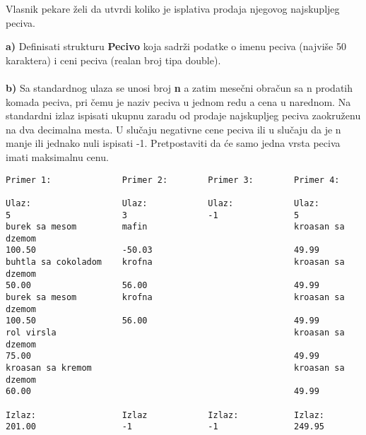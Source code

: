 \begin{Exercise}[label=v1.3_01] 
    Vlasnik pekare želi da utvrdi koliko je isplativa prodaja njegovog
    najskupljeg peciva.
    
    \textbf{a)} Definisati strukturu \textbf{Pecivo} koja sadrži
    podatke o imenu peciva (najviše 50 karaktera) i ceni peciva
    (realan broj tipa double).  \\ \\ \textbf{b)} Sa standardnog ulaza
    se unosi broj \textbf{n} a zatim mesečni obračun sa n prodatih
    komada peciva, pri \v cemu je naziv peciva u jednom redu a cena u
    narednom. Na standardni izlaz ispisati ukupnu zaradu od prodaje
    najskupljeg peciva zaokruženu na dva decimalna mesta. U slučaju
    negativne cene peciva ili u slu\v caju da je n manje ili jednako
    nuli ispisati -1. Pretpostaviti da će samo jedna vrsta peciva
    imati maksimalnu cenu.
     


\begin{center}
\begin{verbatim}
Primer 1:              Primer 2:        Primer 3:        Primer 4:  

Ulaz:                  Ulaz:            Ulaz:            Ulaz:
5                      3                -1               5
burek sa mesom         mafin                             kroasan sa dzemom
100.50                 -50.03                            49.99
buhtla sa cokoladom    krofna                            kroasan sa dzemom
50.00                  56.00                             49.99
burek sa mesom         krofna                            kroasan sa dzemom
100.50                 56.00                             49.99
rol virsla                                               kroasan sa dzemom
75.00                                                    49.99
kroasan sa kremom                                        kroasan sa dzemom
60.00                                                    49.99

Izlaz:                 Izlaz            Izlaz:           Izlaz:
201.00                 -1               -1               249.95
\end{verbatim}
\end{center}
\end{Exercise}
\begin{Answer}[ref=v1.3_01]
\end{Answer}



